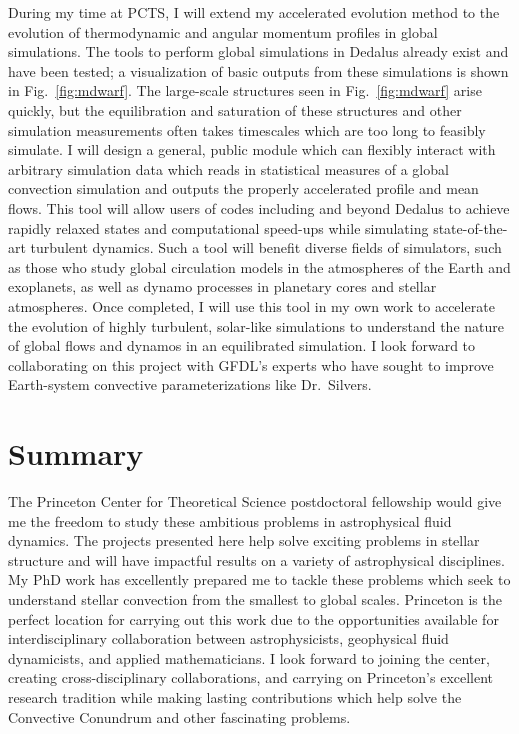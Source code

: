 \documentclass[11pt, preprint]{aastex}
\begin{document}
During my time at PCTS, I will extend my accelerated evolution method to the evolution of thermodynamic and angular momentum profiles in global simulations.
The tools to perform global simulations in Dedalus already exist \citep{lecoanet&all2018} and have been tested; a visualization of basic outputs from these simulations is shown in Fig.~\ref{fig:mdwarf}.
The large-scale structures seen in Fig.~\ref{fig:mdwarf} arise quickly, but the equilibration and saturation of these structures and other simulation measurements often takes timescales which are too long to feasibly simulate.
I will design a general, public module which can flexibly interact with arbitrary simulation data which reads in statistical measures of a global convection simulation and outputs the properly accelerated profile and mean flows.
This tool will allow users of codes including and beyond Dedalus to achieve rapidly relaxed states and computational speed-ups while simulating state-of-the-art turbulent dynamics.
Such a tool will benefit diverse fields of simulators, such as those who study global circulation models in the atmospheres of the Earth and exoplanets, as well as dynamo processes in planetary cores and stellar atmospheres.
Once completed, I will use this tool in my own work to accelerate the evolution of highly turbulent, solar-like simulations to understand the nature of global flows and dynamos in an equilibrated simulation.
I look forward to collaborating on this project with GFDL's experts who have sought to improve Earth-system convective parameterizations like Dr.~Silvers.


\vspace{-0.8cm}
\section{Summary}
\vspace{-0.3cm}
The Princeton Center for Theoretical Science postdoctoral fellowship would give me the freedom to study these ambitious problems in astrophysical fluid dynamics.
The projects presented here help solve exciting problems in stellar structure and will have impactful results on a variety of astrophysical disciplines.
My PhD work has excellently prepared me to tackle these problems which seek to understand stellar convection from the smallest to global scales.
Princeton is the perfect location for carrying out this work due to the opportunities available for interdisciplinary collaboration between astrophysicists, geophysical fluid dynamicists, and applied mathematicians.
I look forward to joining the center, creating cross-disciplinary collaborations, and carrying on Princeton's excellent research tradition while making lasting contributions which help solve the Convective Conundrum and other fascinating problems. 

\newpage


\end{document}
